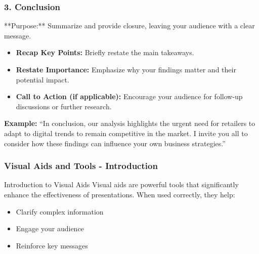 \documentclass{beamer}
\begin{document}
\begin{frame}[fragile]
    \frametitle{3. Conclusion}
    **Purpose:** Summarize and provide closure, leaving your audience with a clear message.
    \begin{itemize}
        \item \textbf{Recap Key Points:} Briefly restate the main takeaways.
        \item \textbf{Restate Importance:} Emphasize why your findings matter and their potential impact.
        \item \textbf{Call to Action (if applicable):} Encourage your audience for follow-up discussions or further research.
    \end{itemize}
    \textbf{Example:} “In conclusion, our analysis highlights the urgent need for retailers to adapt to digital trends to remain competitive in the market. I invite you all to consider how these findings can influence your own business strategies.”
\end{frame}

\begin{frame}[fragile]
    \frametitle{Visual Aids and Tools - Introduction}
    \begin{block}{Introduction to Visual Aids}
        Visual aids are powerful tools that significantly enhance the effectiveness of presentations. 
        When used correctly, they help:
        \begin{itemize}
            \item Clarify complex information
            \item Engage your audience
            \item Reinforce key messages
        \end{itemize}
    \end{block}
\end{frame}
\end{document}
